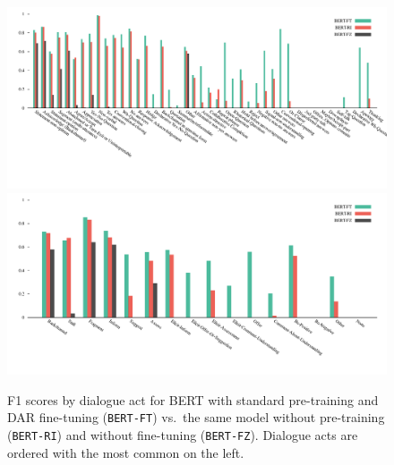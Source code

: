 \documentclass[11pt,a4paper]{article}
\begin{document}
\begin{figure}[h!]
  \centering
  \includegraphics[width=\linewidth]{img/swda-brf.pdf}
  \includegraphics[width=\linewidth]{img/ami-brf.pdf}
  \caption{F1 scores by dialogue act for BERT with standard pre-training and DAR fine-tuning (\texttt{BERT-FT}) vs.~the same model without pre-training (\texttt{BERT-RI}) and without fine-tuning (\texttt{BERT-FZ}). Dialogue acts are ordered with the most common on the left.}
    \label{fig:f1-by-da}
  \end{figure}
\end{document}
